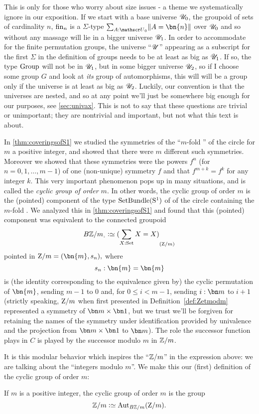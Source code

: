 \begin{remark}
  \label{rem:groupsarebig}
  This is only for those who worry about size issues - a theme we systematically ignore in our exposition.  If we start with a base universe ${\mathscr{U}}_0$, the groupoid of sets of cardinality $n$, $\fin_n$ is a $\Sigma$-type $\sum_{A:\UU_0}\Trunc{A=\bn{n}}$ over ${\mathscr{U}}_0$ and so without any massage will lie in a bigger universe ${\mathscr{U}}_1$.  In order to accommodate for the finite permutation groups, the universe ``${\mathscr{U}}$'' appearing as a subscript for the first $\Sigma$ in the definition of groups needs to be at least as big as ${\mathscr{U}}_1$.  If so, the type $\mathrm{Group}$ will not be in ${\mathscr{U}}_1$, but in some bigger universe ${\mathscr{U}}_2$, so if I choose some group $G$ and look at \emph{its} group of automorphisms, this will will be a group only if the universe is at least as big as ${\mathscr{U}}_2$.  Luckily, our convention is that the universes are nested, and so at any point we'll just be somewhere big enough for our purposes, see \cref{sec:univax}.  This is not to say that these questions are trivial or unimportant; they are nontrivial and important, but not what this text is about.
\end{remark}

\begin{example}\label{ex:cyclicgroups}
In \cref{thm:coveringsofS1} we studied the symmetries of the ``$m$-fold \covering'' 
of the circle for $m$ a positive integer, and showed that there were $m$ different
such symmetries. Moreover we showed that these symmetries were the powers $f^n$ (for $n=0,1,\dots,m-1$)
of one (non-unique) symmetry $f$ and that $f^{m+k}=f^k$ for any integer $k$.
This very important phenomenon pops up in many situations, 
and is called the \emph{cyclic group of order $m$}.
In other words, the cyclic group of order $m$ is the (pointed) component of the type $\mathrm{SetBundle}({\mathrm{S}^1})$ of \coverings of the circle containing the $m$-fold \covering.
We analyzed this in \cref{thm:coveringsofS1} and found that this (pointed) component was equivalent to the connected groupoid
$$B\ZZ/m_\div\defequi\conncomp{(\sum_{X:\Set}X=X)}{\zet/m}$$
pointed in $\zet/m = (\bn{m},s_n),$
where 
$$s_n :\bn{m}=\bn{m}$$ is (the identity corresponding to the equivalence given by) 
the cyclic permutation of $\bn{m}$, sending $m-1$ to $0$ and, 
for $0\leq i<m-1$, sending $i:\bn m$ to $i+1$ (strictly speaking, $\mathrm{Z}/m$ when first presented in Definition~\ref{def:Zetmodm} represented a symmetry of $\bn m\times\bn 1$, but we trust we'll be forgiven for retaining the names of the symmetry under identification provided by univalence and the projection from $\bn m\times \bn1$ to $\bn m$). The role
the successor function plays in $C$ is played by the successor modulo $m$ in $\mathbb{Z}/m$. 

It is this modular behavior which inspires the ``$\mathbb{Z}/m$'' in the expression above: we are talking about the ``integers modulo $m$''.
We make this our (first) definition of the cyclic group of order $m$:
\end{example}
\begin{definition}\label{def:Z/mgroup}
  If $m$ is a positive integer, the cyclic group of order $m$ is the group
  $$\ZZ/m\defequi\aut_{B\ZZ/m}(\zet/m).$$
\end{definition}


